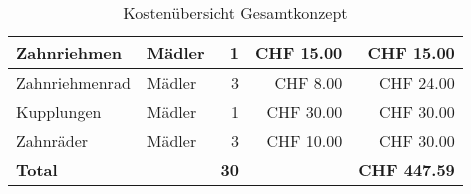 \documentclass[../../main.tex]{subfiles}
\begin{document}
\begin{table}[H]
\begin{tabular}{|p{6cm}|l|r|r|r|}
    Zahnriehmen                                             & Mädler             & 1               & CHF 15.00           & CHF 15.00             \\ \hline \nocite{MadlerZahnriemen}
    Zahnriehmenrad                                          & Mädler             & 3               & CHF 8.00            & CHF 24.00             \\ \hline \nocite{MadlerZahnriemenrad}
    Kupplungen                                              & Mädler             & 1               & CHF 30.00           & CHF 30.00             \\ \hline \nocite{MadlerKupplung}
    Zahnräder                                               & Mädler             & 3               & CHF 10.00           & CHF 30.00             \\ \hline \hline \nocite{MadlerZahnrad}
    \textbf{Total}                                          & \textbf{}          & \textbf{30}     & \textbf{}           & \textbf{CHF 447.59}   \\ \hline
    \end{tabular}
    \caption{Kostenübersicht Gesamtkonzept}
    \label{tab:kosten_total}
    \end{table}
\end{document}
